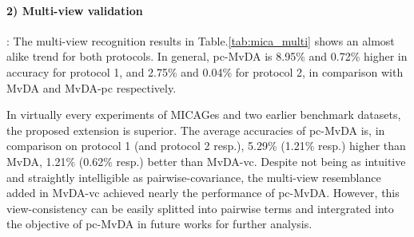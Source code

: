    \paragraph{2) Multi-view validation}: The multi-view recognition results in Table.\ref{tab:mica_multi} shows an almost alike trend for both protocols. In general, pc-MvDA is 8.95\% and 0.72\% higher in accuracy for protocol 1, and 2.75\% and 0.04\% for protocol 2, in comparison with MvDA and MvDA-pc respectively.

    In virtually every experiments of MICAGes and two earlier benchmark datasets, the proposed extension is superior. The average accuracies of pc-MvDA is, in comparison on protocol 1 (and protocol 2 resp.), 5.29\% (1.21\% resp.) higher than MvDA, 1.21\% (0.62\% resp.) better than MvDA-vc. Despite not being as intuitive and straightly intelligible as pairwise-covariance, the multi-view resemblance added in MvDA-vc achieved nearly the performance of pc-MvDA. However, this view-consistency can be easily splitted into pairwise terms and intergrated into the objective of pc-MvDA in future works for further analysis.

    \begin{table}[htbp]
    \centering
    \caption{Multi-view recognition comparison on MICAGes dataset}
    \label{tab:mica_multi}
    \end{table}


